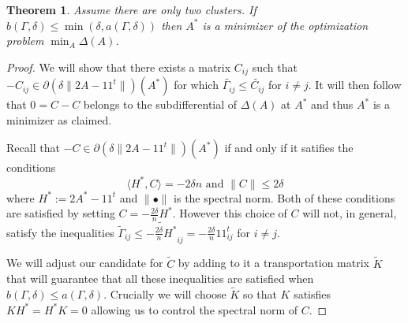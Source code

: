 \documentclass[12pt]{amsart}
\newtheorem{theorem}[lemma]{Theorem}
\theoremstyle{remark}
\begin{document}
\begin{theorem}\label{thm: transport} Assume there are only two clusters. If $b(\Gamma,\delta)\leq \min(\delta, a(\Gamma,\delta))$ then $A^*$ is a minimizer of the optimization problem $\min_A\Delta(A)$. 
\end{theorem}
\begin{proof} We will show that there exists a matrix $C_{ij}$ such that $-C_{ij}\in \partial \left(\delta\|2A-11^t\|\right)(A^*)$ for which $\widetilde{\Gamma_{ij}}\leq \widetilde{C_{ij}}$ for $i\neq j$. It will then follow that $0=C-C$ belongs to the subdifferential of $\Delta(A)$ at $A^*$ and thus $A^*$ is a minimizer as claimed.

Recall that $-C\in \partial \left(\delta\|2A-11^t\|\right)(A^*)$ if and only if it satifies the conditions
\[ \langle H^* , C\rangle =-2\delta n\text{ and }\|C\|\leq 2\delta \]
where $H^*:=2A^*-11^t$ and $\|\bullet\|$ is the spectral norm. 
Both of these conditions are satisfied by setting $C=-\frac{2\delta}{n} H^*$. However this choice of $C$ will not, in general, satisfy the inequalities $\widetilde{\Gamma}_{ij}\leq \widetilde{-\frac{2\delta}{n} H^*}_{ij}=-\frac{2\delta}{n}11^t_{ij}$ for $i\neq j$. 

We will adjust our candidate for $\widetilde{C}$ by adding to it a transportation matrix $\widetilde{K}$ that will guarantee that all these inequalities are satisfied when $b(\Gamma,\delta)\leq a(\Gamma, \delta)$. Crucially we will choose $\widetilde{K}$ so that $K$ satisfies $KH^*=H^*K=0$ allowing us to control the spectral norm of $C$.


\end{proof}
\end{document}
